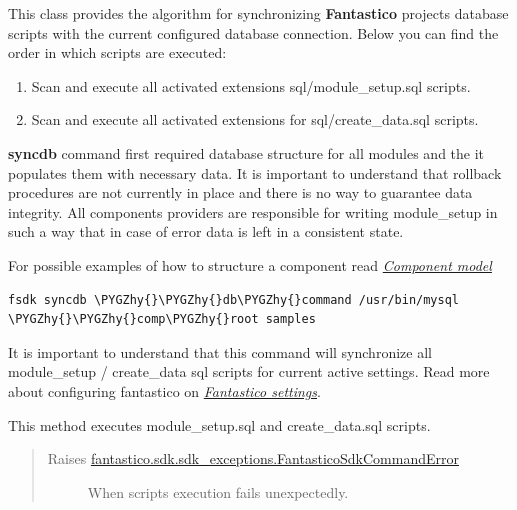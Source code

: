\documentclass[letterpaper,10pt,english]{sphinxmanual}
\def\PYGZhy{\char`\-}
\begin{document}
\begin{fulllineitems}
\label{features/sdk/command_syncdb:fantastico.sdk.commands.command_syncdb.SdkCommandSyncDb}
This class provides the algorithm for synchronizing \textbf{Fantastico} projects database scripts with the current configured
database connection. Below you can find the order in which scripts are executed:
\begin{enumerate}
\item {} 
Scan and execute all activated extensions sql/module\_setup.sql scripts.

\item {} 
Scan and execute all activated extensions for sql/create\_data.sql scripts.

\end{enumerate}

\textbf{syncdb} command first required database structure for all modules and the it populates them with necessary data. It is
important to understand that rollback procedures are not currently in place and there is no way to guarantee data integrity.
All components providers are responsible for writing module\_setup in such a way that in case of error data is left in a
consistent state.

For possible examples of how to structure a component read {\hyperref[features/component_model::doc]{\emph{Component model}}}

\begin{Verbatim}[commandchars=\\\{\}]
fsdk syncdb \PYGZhy{}\PYGZhy{}db\PYGZhy{}command /usr/bin/mysql \PYGZhy{}\PYGZhy{}comp\PYGZhy{}root samples
\end{Verbatim}

It is important to understand that this command will synchronize all module\_setup / create\_data sql scripts for current active
settings. Read more about configuring fantastico on {\hyperref[get_started/settings::doc]{\emph{Fantastico settings}}}.

\begin{fulllineitems}
\label{features/sdk/command_syncdb:fantastico.sdk.commands.command_syncdb.SdkCommandSyncDb.exec}
This method executes module\_setup.sql and create\_data.sql scripts.
\begin{quote}\begin{description}
\item[{Raises {\hyperref[features/sdk:fantastico.sdk.sdk_exceptions.FantasticoSdkCommandError]{fantastico.sdk.sdk\_exceptions.FantasticoSdkCommandError}}}] \leavevmode
When scripts execution fails unexpectedly.


\end{description}
\end{quote}
\end{fulllineitems}
\end{fulllineitems}
\end{document}

